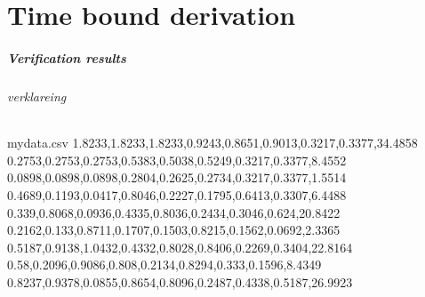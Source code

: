  
 
 
 
 
 
 
 
 \chapter{Time bound derivation}
 
 
 \paragraph{Verification results}
 
 
 
 
 
 
 \subparagraph{verklareing}
 
 
 \begin{filecontents*}{mydata.csv}
 	1.8233,1.8233,1.8233,0.9243,0.8651,0.9013,0.3217,0.3377,34.4858
 	0.2753,0.2753,0.2753,0.5383,0.5038,0.5249,0.3217,0.3377,8.4552
 	0.0898,0.0898,0.0898,0.2804,0.2625,0.2734,0.3217,0.3377,1.5514
 	0.4689,0.1193,0.0417,0.8046,0.2227,0.1795,0.6413,0.3307,6.4488
 	0.339,0.8068,0.0936,0.4335,0.8036,0.2434,0.3046,0.624,20.8422
 	0.2162,0.133,0.8711,0.1707,0.1503,0.8215,0.1562,0.0692,2.3365
 	0.5187,0.9138,1.0432,0.4332,0.8028,0.8406,0.2269,0.3404,22.8164
 	0.58,0.2096,0.9086,0.808,0.2134,0.8294,0.333,0.1596,8.4349
 	0.8237,0.9378,0.0855,0.8654,0.8096,0.2487,0.4338,0.5187,26.9923 
 \end{filecontents*}
 
